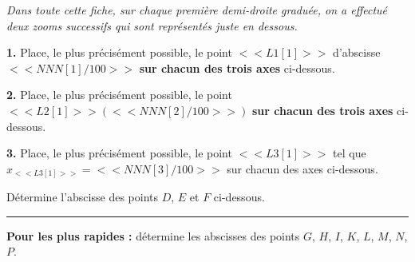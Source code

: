 
{}

\vspace{-0.8cm}

\textit{Dans toute cette fiche, sur chaque première demi-droite graduée, on a effectué deux zooms successifs qui sont représentés juste en dessous.}

\vfill




\textbf{1.} Place, le plus précisément possible, le point $<<L1[1]>>$ d'abscisse $<<NNN[1]/100>>$ \textbf{sur chacun des trois axes} ci-dessous.

\vfill

{} \hfill 
{}
\hfill {}

\vfill

\textbf{2.} Place, le plus précisément possible, le point $<<L2[1]>> (<<NNN[2]/100>>)$ \textbf{sur chacun des trois axes} ci-dessous.

\vfill

{} \hfill 
{}
\hfill {}

\vfill

\textbf{3.} Place, le plus précisément possible, le point $<<L3[1]>>$ tel que $x_{<<L3[1]>>}=<<NNN[3]/100>>$ sur chacun des axes ci-dessous.

\vfill

{} \hfill 
{}
\hfill {}

\vfill




Détermine l'abscisse des points $D$, $E$ et $F$ ci-dessous.


{} \hfill 
{}
\hfill {}

\vfill

\hrule

\vfill

\textbf{Pour les plus rapides :}  détermine les abscisses des points $G$, $H$, $I$, $K$, $L$, $M$, $N$, $P$.

{} \hfill 
{}
\hfill {}

\vfill

{}

\vfill

{} \hfill 
{}
\hfill {}

\vfill
 

